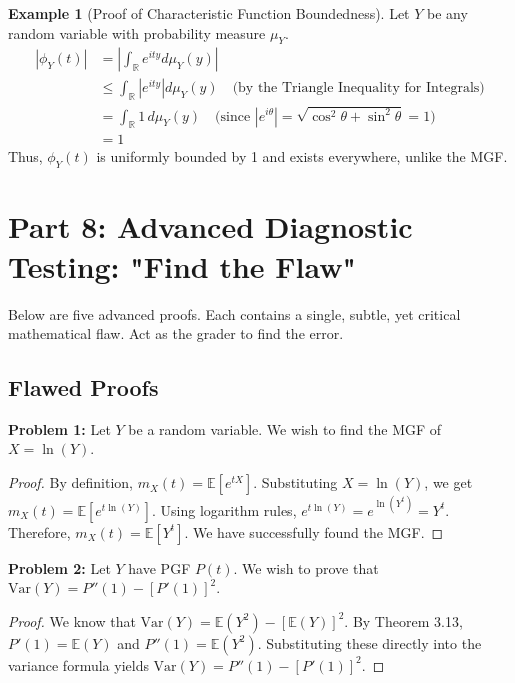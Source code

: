 \documentclass[11pt, a4paper]{article}
\theoremstyle{definition}
\newtheorem{example}{Example}[section]
\theoremstyle{remark}
\newcommand{\E}{\mathbb{E}}
\newcommand{\Var}{\mathrm{Var}}
\newcommand{\R}{\mathbb{R}}
\begin{document}
\begin{example}[Proof of Characteristic Function Boundedness]
Let $Y$ be any random variable with probability measure $\mu_Y$.
\begin{align*}
    |\phi_Y(t)| &= \left| \int_{\R} e^{ity} d\mu_Y(y) \right| \\
                &\le \int_{\R} \left| e^{ity} \right| d\mu_Y(y) \quad \text{(by the Triangle Inequality for Integrals)} \\
                &= \int_{\R} 1 \, d\mu_Y(y) \quad \text{(since } |e^{i\theta}| = \sqrt{\cos^2\theta + \sin^2\theta} = 1 \text{)} \\
                &= 1
\end{align*}
Thus, $\phi_Y(t)$ is uniformly bounded by 1 and exists everywhere, unlike the MGF.
\end{example}

\section{Part 8: Advanced Diagnostic Testing: "Find the Flaw"}

Below are five advanced proofs. Each contains a single, subtle, yet critical mathematical flaw. Act as the grader to find the error.

\subsection{Flawed Proofs}

\textbf{Problem 1:} Let $Y$ be a random variable. We wish to find the MGF of $X = \ln(Y)$.
\begin{proof}
By definition, $m_X(t) = \E[e^{tX}]$. Substituting $X = \ln(Y)$, we get $m_X(t) = \E[e^{t \ln(Y)}]$. Using logarithm rules, $e^{t \ln(Y)} = e^{\ln(Y^t)} = Y^t$. Therefore, $m_X(t) = \E[Y^t]$. We have successfully found the MGF.
\end{proof}

\textbf{Problem 2:} Let $Y$ have PGF $P(t)$. We wish to prove that $\Var(Y) = P''(1) - [P'(1)]^2$.
\begin{proof}
We know that $\Var(Y) = \E(Y^2) - [\E(Y)]^2$.
By Theorem 3.13, $P'(1) = \E(Y)$ and $P''(1) = \E(Y^2)$.
Substituting these directly into the variance formula yields $\Var(Y) = P''(1) - [P'(1)]^2$.
\end{proof}
\end{document}

